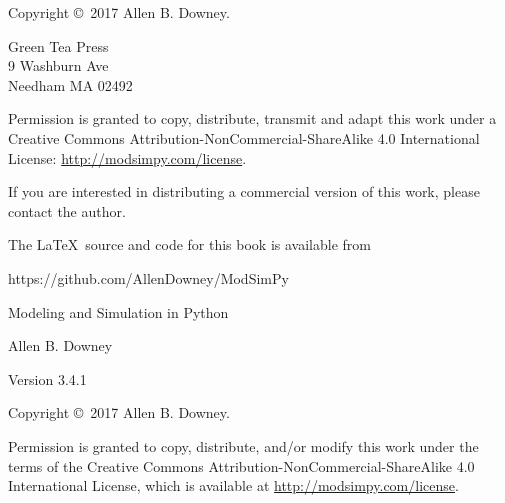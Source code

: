 \documentclass[12pt]{book}
\newcommand{\thetitle}{Modeling and Simulation in Python}
\newcommand{\theauthors}{Allen B. Downey}
\newcommand{\theversion}{3.4.1}
\theoremstyle{exercise}
\begin{document}
\begin{latexonly}
\pagebreak
\thispagestyle{empty}

Copyright \copyright ~2017 \theauthors.



\vspace{0.2in}

\begin{flushleft}
Green Tea Press       \\
9 Washburn Ave \\
Needham MA 02492
\end{flushleft}

Permission is granted to copy, distribute, transmit and adapt this work under a Creative Commons Attribution-NonCommercial-ShareAlike 4.0 International License: \url{http://modsimpy.com/license}.


If you are interested in distributing a commercial version of this
work, please contact the author.

The \LaTeX\ source and code for this book is available from

\begin{code}
https://github.com/AllenDowney/ModSimPy
\end{code}


\cleardoublepage
\setcounter{tocdepth}{1}
\tableofcontents

\end{latexonly}



\begin{htmlonly}

\vspace{1em}

{\Large \thetitle}

{\large \theauthors}

Version \theversion

\vspace{1em}

Copyright \copyright ~2017 \theauthors.

Permission is granted to copy, distribute, and/or modify this work
under the terms of the Creative Commons
Attribution-NonCommercial-ShareAlike 4.0 International License, which is
available at \url{http://modsimpy.com/license}.

\vspace{1em}

\setcounter{chapter}{-1}

\end{htmlonly}
\end{document}
